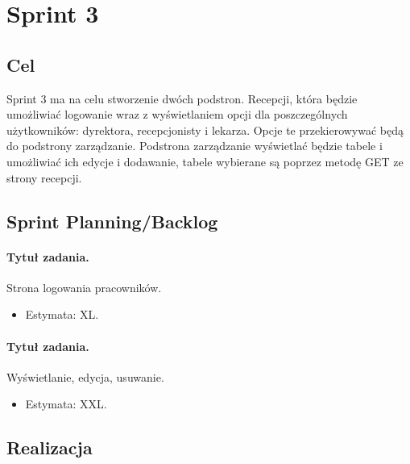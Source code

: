 \documentclass[a4paper]{article} \usepackage{polski} \usepackage[cp1250]{inputenc} \usepackage{url}
\begin{document}
\section{Sprint 3}\label{Sprint33} \subsection{Cel}\label{Sprint33cel} Sprint 3 ma na celu stworzenie dwóch podstron. Recepcji, która będzie umożliwiać logowanie wraz z wyświetlaniem opcji dla poszczególnych użytkowników: dyrektora, recepcjonisty i lekarza. Opcje te przekierowywać będą do podstrony zarządzanie. Podstrona zarządzanie wyświetlać będzie tabele i umożliwiać ich edycje i dodawanie, tabele wybierane są poprzez metodę GET ze strony recepcji. \subsection{Sprint Planning/Backlog}\label{Sprint33SPB}

\paragraph{Tytuł zadania.} Strona logowania pracowników. \begin{itemize} \item Estymata: XL. \end{itemize}
\paragraph{Tytuł zadania.} Wyświetlanie, edycja, usuwanie. \begin{itemize} \item Estymata: XXL. \end{itemize}


\subsection{Realizacja}\label{Sprint33realizacja}
\end{document}
